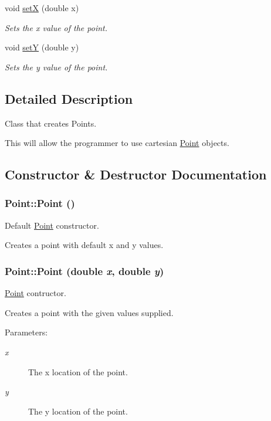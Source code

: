 \begin{CompactItemize}
void \hyperlink{class_point_9aa66c310860d038cb1258dc5cd80906}{setX} (double x)
\begin{CompactList}\small\item\em Sets the x value of the point. \item\end{CompactList}\item 
void \hyperlink{class_point_7d1ee63237f361d41e697f87c3cb051d}{setY} (double y)
\begin{CompactList}\small\item\em Sets the y value of the point. \item\end{CompactList}\end{CompactItemize}


\subsection{Detailed Description}
Class that creates Points. 

This will allow the programmer to use cartesian \hyperlink{class_point}{Point} objects. 

\subsection{Constructor \& Destructor Documentation}
\hypertarget{class_point_d92f2337b839a94ce97dcdb439b4325a}{
\subsubsection[{Point}]{\setlength{\rightskip}{0pt plus 5cm}Point::Point ()}}
\label{class_point_d92f2337b839a94ce97dcdb439b4325a}


Default \hyperlink{class_point}{Point} constructor. 

Creates a point with default x and y values. \hypertarget{class_point_78b55e8d5466bb8c2cf60fa55f2562ff}{
\subsubsection[{Point}]{\setlength{\rightskip}{0pt plus 5cm}Point::Point (double {\em x}, \/  double {\em y})}}
\label{class_point_78b55e8d5466bb8c2cf60fa55f2562ff}


\hyperlink{class_point}{Point} contructor. 

Creates a point with the given values supplied. \begin{Desc}
\item[Parameters:]
\begin{description}
\item[{\em x}]The x location of the point. \item[{\em y}]The y location of the point. \end{description}
\end{Desc}


